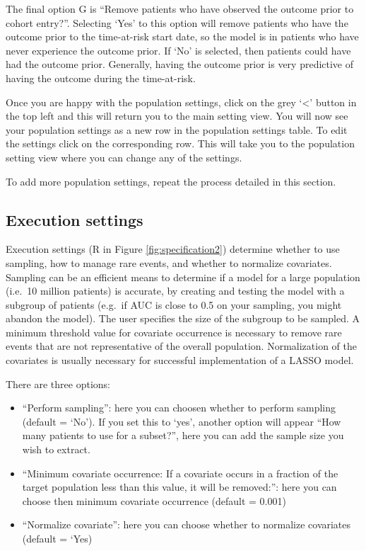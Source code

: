 \documentclass[11pt]{book}
\providecommand{\tightlist}{%
  \setlength{\itemsep}{0pt}\setlength{\parskip}{0pt}}
\theoremstyle{definition}
\theoremstyle{definition}
\theoremstyle{definition}
\theoremstyle{remark}
\begin{document}
The final option G is ``Remove patients who have observed the outcome prior to cohort entry?''. Selecting `Yes' to this option will remove patients who have the outcome prior to the time-at-risk start date, so the model is in patients who have never experience the outcome prior. If `No' is selected, then patients could have had the outcome prior. Generally, having the outcome prior is very predictive of having the outcome during the time-at-risk.

Once you are happy with the population settings, click on the grey `\textless{}' button in the top left and this will return you to the main setting view. You will now see your population settings as a new row in the population settings table. To edit the settings click on the corresponding row. This will take you to the population setting view where you can change any of the settings.

To add more population settings, repeat the process detailed in this section.

\hypertarget{execution-settings}{%
\subsection{Execution settings}\label{execution-settings}}

Execution settings (R in Figure \ref{fig:specification2}) determine whether to use sampling, how to manage rare events, and whether to normalize covariates. Sampling can be an efficient means to determine if a model for a large population (i.e.~10 million patients) is accurate, by creating and testing the model with a subgroup of patients (e.g.~if AUC is close to 0.5 on your sampling, you might abandon the model). The user specifies the size of the subgroup to be sampled. A minimum threshold value for covariate occurrence is necessary to remove rare events that are not representative of the overall population. Normalization of the covariates is usually necessary for successful implementation of a LASSO model.

There are three options:

\begin{itemize}
\tightlist
\item
  ``Perform sampling'': here you can choosen whether to perform sampling (default = `No'). If you set this to `yes', another option will appear ``How many patients to use for a subset?'', here you can add the sample size you wish to extract.
\item
  ``Minimum covariate occurrence: If a covariate occurs in a fraction of the target population less than this value, it will be removed:'': here you can choose then minimum covariate occurrence (default = 0.001)
\item
  ``Normalize covariate'': here you can choose whether to normalize covariates (default = `Yes)
\end{itemize}
\end{document}
